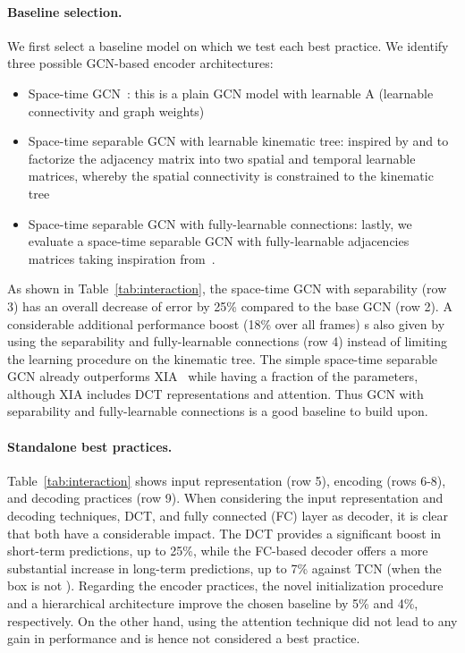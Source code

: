 \documentclass[10pt,twocolumn,letterpaper]{article}
\newcommand{\cmark}{\ding{51}}
\begin{document}
\paragraph{Baseline selection.}
We first select a baseline model on which we test each best practice. We identify three possible GCN-based encoder architectures:
\begin{itemize}
    \item Space-time GCN~\cite{yan18}: this is a plain GCN model  with learnable A (learnable connectivity and graph weights)
    \item Space-time separable GCN with learnable kinematic tree: inspired by \cite{yan18} and \cite{sofianos21} to factorize the adjacency matrix into two spatial and temporal learnable matrices, whereby the spatial connectivity is constrained to the kinematic tree
    \item Space-time separable GCN with fully-learnable connections: lastly, we evaluate a space-time separable GCN with fully-learnable adjacencies matrices taking inspiration from~\cite{sofianos21}. 
\end{itemize}

As shown in Table~\ref{tab:interaction}, the space-time GCN with separability (row 3) has an overall decrease of error by 25\% compared to the base GCN (row 2). A considerable additional performance boost (18\% over all frames) s also given by using the separability and fully-learnable connections (row 4) instead of limiting the learning procedure on the kinematic tree. The simple space-time separable GCN already outperforms XIA~\cite{guo21} while having a fraction of the parameters, although XIA includes DCT representations and attention. Thus GCN with separability and fully-learnable connections is a good baseline to build upon.


\paragraph{Standalone best practices.}
Table~\ref{tab:interaction} shows input representation (row 5), encoding (rows 6-8), and decoding practices (row 9). When considering the input representation and decoding techniques, DCT, and fully connected (FC) layer as decoder, it is clear that both have a considerable impact. The DCT provides a significant boost in short-term predictions, up to 25\%, while the FC-based decoder offers a more substantial increase in long-term predictions, up to 7\% against TCN (when the box is not \cmark ). Regarding the encoder practices, the novel initialization procedure and a hierarchical architecture improve the chosen baseline by 5\% and 4\%, respectively. On the other hand, using the attention technique did not lead to any gain in performance and is hence not considered a best practice.
\end{document}
